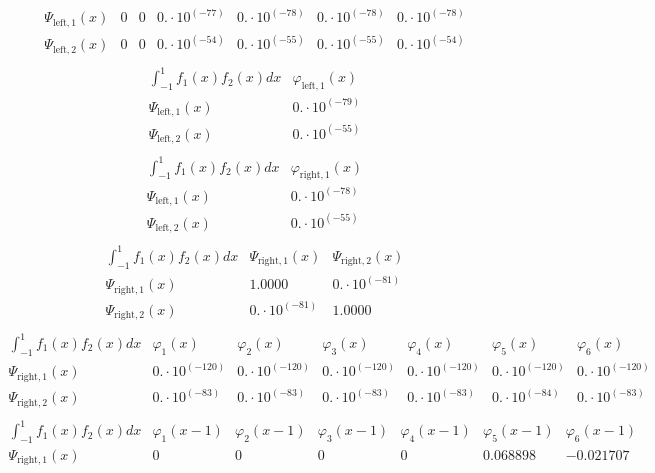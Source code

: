 \documentclass{article}
\begin{document}
\begin{landscape}
$$\begin{array}{l|llllll}
 \Psi_{\text{left},1}(x) & 0 & 0 & 0.\cdot 10^{(-77)} & 0.\cdot 10^{(-78)} & 0.\cdot 10^{(-78)} & 0.\cdot 10^{(-78)} \\ 
\Psi_{\text{left},2}(x) & 0 & 0 & 0.\cdot 10^{(-54)} & 0.\cdot 10^{(-55)} & 0.\cdot 10^{(-55)} & 0.\cdot 10^{(-54)} \\ 
\end{array} $$ 
$$ \begin{array}{l|l}
\int_{-1}^1 f_1(x)f_2(x) dx& \varphi_{\text{left},1}(x) \\ \hline 
 \Psi_{\text{left},1}(x) & 0.\cdot 10^{(-79)} \\ 
\Psi_{\text{left},2}(x) & 0.\cdot 10^{(-55)} \\ 
\end{array} $$ 
$$ \begin{array}{l|l}
\int_{-1}^1 f_1(x)f_2(x) dx& \varphi_{\text{right},1}(x) \\ \hline 
 \Psi_{\text{left},1}(x) & 0.\cdot 10^{(-78)} \\ 
\Psi_{\text{left},2}(x) & 0.\cdot 10^{(-55)} \\ 
\end{array} $$ 
$$ \begin{array}{l|ll}
\int_{-1}^1 f_1(x)f_2(x) dx& \Psi_{\text{right},1}(x)& \Psi_{\text{right},2}(x) \\ \hline 
 \Psi_{\text{right},1}(x) & 1.0000 & 0.\cdot 10^{(-81)} \\ 
\Psi_{\text{right},2}(x) & 0.\cdot 10^{(-81)} & 1.0000 \\ 
\end{array} $$
$$ \begin{array}{l|llllll}
\int_{-1}^1 f_1(x)f_2(x) dx& \varphi_1(x)& \varphi_2(x)& \varphi_3(x)& \varphi_4(x)& \varphi_5(x)& \varphi_6(x) \\ \hline 
 \Psi_{\text{right},1}(x) & 0.\cdot 10^{(-120)} & 0.\cdot 10^{(-120)} & 0.\cdot 10^{(-120)} & 0.\cdot 10^{(-120)} & 0.\cdot 10^{(-120)} & 0.\cdot 10^{(-120)} \\ 
\Psi_{\text{right},2}(x) & 0.\cdot 10^{(-83)} & 0.\cdot 10^{(-83)} & 0.\cdot 10^{(-83)} & 0.\cdot 10^{(-83)} & 0.\cdot 10^{(-84)} & 0.\cdot 10^{(-83)} \\ 
\end{array} $$ 
$$ \begin{array}{l|llllll}
\int_{-1}^1 f_1(x)f_2(x) dx& \varphi_1(x-1)& \varphi_2(x-1)& \varphi_3(x-1)& \varphi_4(x-1)& \varphi_5(x-1)& \varphi_6(x-1) \\ \hline 
 \Psi_{\text{right},1}(x) & 0 & 0 & 0 & 0 & 0.068898 & -0.021707 \\ 

\end{array}$$
\end{landscape}
\end{document}
